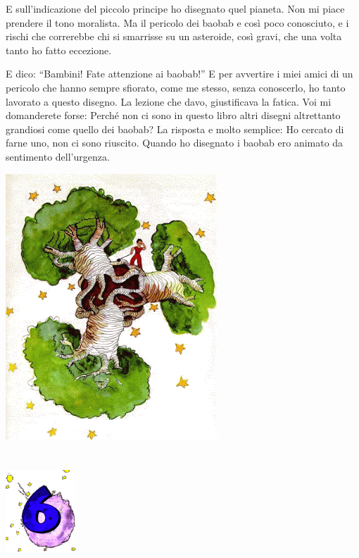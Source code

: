 \documentclass[11pt]{scrbook}
\begin{document}
E sull'indicazione del piccolo principe ho disegnato quel pianeta. Non
mi piace prendere il tono moralista. Ma il pericolo dei baobab e così
poco conosciuto, e i rischi che correrebbe chi si smarrisse su un
asteroide, così gravi, che una volta tanto ho fatto eccezione.

E dico: ``Bambini! Fate attenzione ai baobab!'' E per avvertire i miei
amici di un pericolo che hanno sempre sfiorato, come me stesso, senza
conoscerlo, ho tanto lavorato a questo disegno. La lezione che davo,
giustificava la fatica. Voi mi domanderete forse: Perché non ci sono in
questo libro altri disegni altrettanto grandiosi come quello dei baobab?
La risposta e molto semplice: Ho cercato di farne uno, non ci sono
riuscito. Quando ho disegnato i baobab ero animato da sentimento
dell'urgenza.

\begin{center}
\includegraphics{./img/baobaby.png}
\end{center}

\chapter{}
\begin{center}
\includegraphics{./img/chapter6.png}
\end{center}
\end{document}
